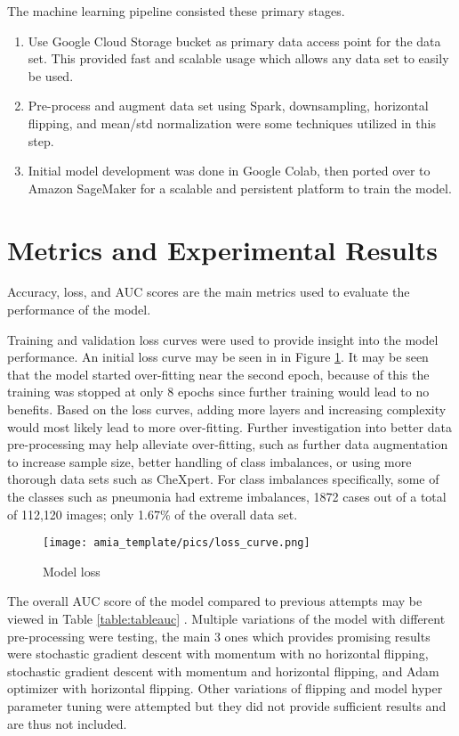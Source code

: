 \documentclass{amia}
\begin{document}
The machine learning pipeline consisted these primary stages.
\begin{enumerate}
  \item Use Google Cloud Storage bucket as primary data access point for the data set. This provided fast and scalable usage which allows any data set to easily be used.
  \item Pre-process and augment data set using Spark, downsampling, horizontal flipping, and mean/std normalization were some techniques utilized in this step.
  \item Initial model development was done in Google Colab, then ported over to Amazon SageMaker for a scalable and persistent platform to train the model.
\end{enumerate}

\section*{Metrics and Experimental Results}
Accuracy, loss, and AUC scores are the main metrics used to evaluate the performance of the model.

Training and validation loss curves were used to provide insight into the model performance. An initial loss curve may be seen in in Figure \ref{figloss}. It may be seen that the model started over-fitting near the second epoch, because of this the training was stopped at only 8 epochs since further training would lead to no benefits. Based on the loss curves, adding more layers and increasing complexity would most likely lead to more over-fitting. Further investigation into better data pre-processing may help alleviate over-fitting, such as further data augmentation to increase sample size, better handling of class imbalances, or using more thorough data sets such as CheXpert. For class imbalances specifically, some of the classes such as pneumonia had extreme imbalances, 1872  cases  out  of  a total of 112,120 images;  only 1.67\% of the overall data set.

\begin{figure}[!htb]
\centering
\texttt{[image: amia\_template/pics/loss\_curve.png]}
\caption{Model loss}
\label{figloss}
\end{figure}

The overall AUC score of the model compared to previous attempts may be viewed in Table \ref{table:tableauc} . Multiple variations of the model with different pre-processing were testing, the main 3 ones which provides promising results were stochastic gradient descent with momentum with no horizontal flipping, stochastic gradient descent with momentum and horizontal flipping, and Adam optimizer with horizontal flipping. Other variations of flipping and model hyper parameter tuning were attempted but they did not provide sufficient results and are thus not included.
\end{document}
